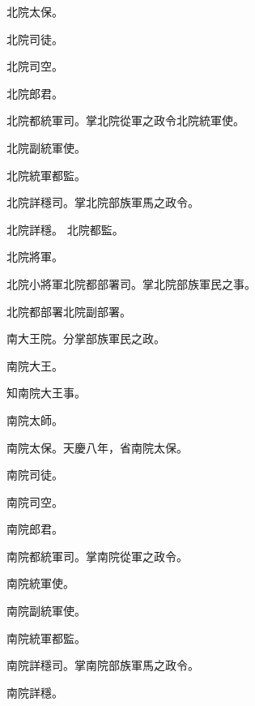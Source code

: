\begin{pinyinscope}
 北院太保。



 北院司徒。



 北院司空。



 北院郎君。



 北院都統軍司。掌北院從軍之政令北院統軍使。



 北院副統軍使。



 北院統軍都監。



 北院詳穩司。掌北院部族軍馬之政令。



 北院詳穩。
 北院都監。



 北院將軍。



 北院小將軍北院都部署司。掌北院部族軍民之事。



 北院都部署北院副部署。



 南大王院。分掌部族軍民之政。



 南院大王。



 知南院大王事。



 南院太師。



 南院太保。天慶八年，省南院太保。



 南院司徒。



 南院司空。



 南院郎君。



 南院都統軍司。掌南院從軍之政令。



 南院統軍使。



 南院副統軍使。



 南院統軍都監。



 南院詳穩司。掌南院部族軍馬之政令。



 南院詳穩。




\end{pinyinscope}
